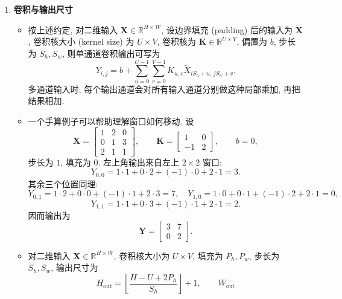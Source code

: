 \documentclass{../nndlcourse}
\begin{document}
\begin{enumerate}
    \item \textbf{卷积与输出尺寸}
    \begin{itemize}
        \item 按上述约定, 对二维输入 $\boldsymbol{X}\in\mathbb{R}^{H\times W}$, 设边界填充 (padding) 后的输入为 $\tilde{\boldsymbol{X}}$, 卷积核大小 (kernel size) 为 $U\times V$, 卷积核为 $\boldsymbol{K}\in\mathbb{R}^{U\times V}$, 偏置为 $b$, 步长为 $S_h,S_w$, 则单通道卷积输出可写为
        \[
            Y_{i,j}
            =
            b
            +
            \sum_{u=0}^{U-1}
            \sum_{v=0}^{V-1}
            K_{u,v}
            \tilde{X}_{iS_h+u,\,jS_w+v}.
        \]
        多通道输入时, 每个输出通道会对所有输入通道分别做这种局部乘加, 再把结果相加.
        \item 一个手算例子可以帮助理解窗口如何移动. 设
        \[
            \boldsymbol{X}
            =
            \begin{bmatrix}
            1 & 2 & 0\\
            0 & 1 & 3\\
            2 & 1 & 1
            \end{bmatrix},
            \qquad
            \boldsymbol{K}
            =
            \begin{bmatrix}
            1 & 0\\
            -1 & 2
            \end{bmatrix},
            \qquad
            b=0,
        \]
        步长为 $1$, 填充为 $0$. 左上角输出来自左上 $2\times2$ 窗口:
        \[
            Y_{0,0}
            =
            1\cdot1+0\cdot2+(-1)\cdot0+2\cdot1
            =
            3.
        \]
        其余三个位置同理:
        \[
            Y_{0,1}=1\cdot2+0\cdot0+(-1)\cdot1+2\cdot3=7,
            \quad
            Y_{1,0}=1\cdot0+0\cdot1+(-1)\cdot2+2\cdot1=0,
        \]
        \[
            Y_{1,1}=1\cdot1+0\cdot3+(-1)\cdot1+2\cdot1=2.
        \]
        因而输出为
        \[
            \boldsymbol{Y}
            =
            \begin{bmatrix}
            3 & 7\\
            0 & 2
            \end{bmatrix}.
        \]
        \item 对二维输入 $\boldsymbol{X}\in\mathbb{R}^{H\times W}$, 卷积核大小为 $U\times V$, 填充为 $P_h,P_w$, 步长为 $S_h,S_w$, 输出尺寸为
        \[
            H_{\mathrm{out}}
            =
            \left\lfloor
            \frac{H-U+2P_h}{S_h}
            \right\rfloor+1,
            \qquad
            W_{\mathrm{out}}
\]
\end{itemize}
\end{enumerate}
\end{document}
